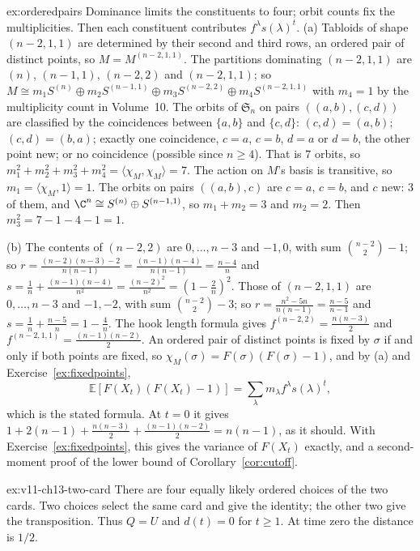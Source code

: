 \begin{solution}{ex:orderedpairs}
\idea Dominance limits the constituents to four; orbit counts fix the multiplicities. Then each constituent contributes $f^\lambda s(\lambda)^t$.
\writeup (a) Tabloids of shape $(n-2,1,1)$ are determined by their second and third rows, an ordered pair of distinct points, so $M=M^{(n-2,1,1)}$. The partitions dominating $(n-2,1,1)$ are $(n)$, $(n-1,1)$, $(n-2,2)$ and $(n-2,1,1)$; so
$M\cong m_1S^{(n)}\oplus m_2S^{(n-1,1)}\oplus m_3S^{(n-2,2)}\oplus m_4S^{(n-2,1,1)}$ with $m_4=1$ by the multiplicity count in Volume~10. The orbits of $\mathfrak S_n$ on pairs $((a,b),(c,d))$ are classified by the coincidences between $\{a,b\}$ and $\{c,d\}$: $(c,d)=(a,b)$; $(c,d)=(b,a)$; exactly one coincidence,
$c=a$, $c=b$, $d=a$ or $d=b$, the other point new; or no coincidence (possible since $n\ge4$). That is $7$ orbits, so $m_1^2+m_2^2+m_3^2+m_4^2=\langle\chi_M,\chi_M\rangle=7$. The action on $M$'s basis is transitive, so $m_1=\langle\chi_M,1\rangle=1$. The orbits on pairs $((a,b),c)$ are $c=a$, $c=b$, and $c$ new:
$3$ of them, and $\C^n\cong S^{(n)}\oplus S^{(n-1,1)}$, so $m_1+m_2=3$ and $m_2=2$. Then $m_3^2=7-1-4-1=1$.

(b) The contents of $(n-2,2)$ are $0,\dots,n-3$ and $-1,0$, with sum $\binom{n-2}2-1$; so $r=\frac{(n-2)(n-3)-2}{n(n-1)}=\frac{(n-1)(n-4)}{n(n-1)}=\frac{n-4}n$ and $s=\frac1n+\frac{(n-1)(n-4)}{n^2}=\frac{(n-2)^2}{n^2}=(1-\frac2n)^2$. Those of $(n-2,1,1)$ are $0,\dots,n-3$ and $-1,-2$, with sum $\binom{n-2}2-3$;
so $r=\frac{n^2-5n}{n(n-1)}=\frac{n-5}{n-1}$ and $s=\frac1n+\frac{n-5}n=1-\frac4n$. The hook length formula gives $f^{(n-2,2)}=\frac{n(n-3)}2$ and $f^{(n-2,1,1)}=\frac{(n-1)(n-2)}2$. An ordered pair of distinct points is fixed by $\sigma$ if and only if both points are fixed, so $\chi_M(\sigma)=F(\sigma)(F(\sigma)-1)$, and
by (a) and Exercise~\ref{ex:fixedpoints},
\[
\mathbb E[F(X_t)(F(X_t)-1)]=\sum_\lambda m_\lambda f^\lambda s(\lambda)^t,
\]
which is the stated formula. At $t=0$ it gives $1+2(n-1)+\frac{n(n-3)}2+\frac{(n-1)(n-2)}2=n(n-1)$, as it should. With Exercise~\ref{ex:fixedpoints}, this gives the variance of $F(X_t)$ exactly, and a second-moment proof of the lower bound of Corollary~\ref{cor:cutoff}.
\end{solution}

\begin{solution}{ex:v11-ch13-two-card}
\idea There are four equally likely ordered choices of the two cards.
\writeup Two choices select the same card and give the identity; the other two give the transposition. Thus $Q=U$ and $d(t)=0$ for $t\ge1$. At time zero the distance is $1/2$.
\end{solution}

